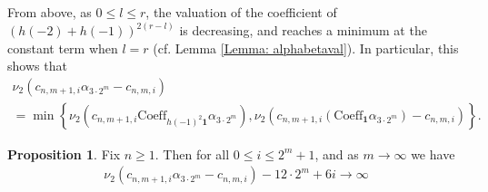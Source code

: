 \documentclass[10pt,a4paper]{amsart}
\numberwithin{equation}{section}
\theoremstyle{definition}
\newtheorem{Prop}[Th]{Proposition}
\begin{document}
From above, as $0 \leq l \leq r$, the valuation of the coefficient of $\left( h(-2)+h(-1) \right)^{2(r-l)}$ is decreasing, and reaches a minimum at the constant term when $l=r$ (cf. Lemma \ref{Lemma: alphabetaval}). In particular, this shows that
\begin{multline*}
    \nu_{2}\left( c_{n,m+1,i} \alpha_{3 \cdot 2^{m}} - c_{n,m,i} \right) \\ = \min \left\lbrace \nu_{2}\left( c_{n,m+1,i} \text{Coeff}_{h(-1)^{2}\textbf{1}} \alpha_{3 \cdot 2^{m}} \right),   \nu_{2} \left( c_{n,m+1,i} \left( \text{Coeff}_{\textbf{1}} \alpha_{3 \cdot 2^{m}} \right) - c_{n,m,i} \right) \right\rbrace.
\end{multline*}
\begin{Prop} 
    Fix $n \geq 1$. Then for all $0 \leq i \leq 2^{m}+1$, and as $m \to \infty$ we have
    \begin{align*}
        \nu_{2}\left( c_{n,m+1,i} \alpha_{3 \cdot 2^{m}} - c_{n,m,i} \right) -12 \cdot 2^{m}+6i \to \infty 
    \end{align*}
\end{Prop}
\end{document}
